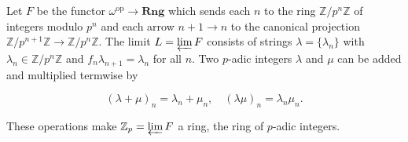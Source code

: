 Let $F$ be the functor $\omega^{\text{op}} \rightarrow \mathbf{Rng}$ which sends each $n$ to the ring $\mathbb{Z}/p^n\mathbb{Z}$ of integers modulo $p^n$ and each arrow $n+1 \rightarrow n$ to the canonical projection $\mathbb{Z}/p^{n+1}\mathbb{Z} \rightarrow \mathbb{Z}/p^n\mathbb{Z}$. The limit $L = \varprojlim F$ consists of strings $\lambda = \{\lambda_n\}$ with $\lambda_n \in \mathbb{Z}/p^n\mathbb{Z}$ and $f_n \lambda_{n+1} = \lambda_n$ for all $n$. Two $p$-adic integers $\lambda$ and $\mu$ can be added and multiplied termwise by

$$(\lambda + \mu)_n = \lambda_n + \mu_n, \quad (\lambda \mu)_n = \lambda_n \mu_n.$$

These operations make $\mathbb{Z}_p = \varprojlim F$ a ring, the ring of $p$-adic integers.
